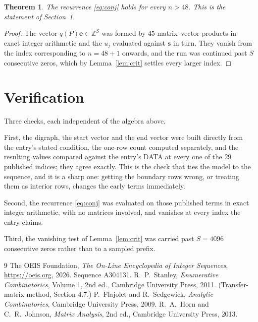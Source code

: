 \documentclass[11pt,a4paper]{article}
\theoremstyle{plain}
\newtheorem{theorem}{Theorem}
\theoremstyle{definition}
\begin{document}
\begin{theorem}
The recurrence \eqref{eq:conj} holds for every $n>48$. This is the statement of
Section~1.
\end{theorem}

\begin{proof}
The vector $q(P)\mathbf{e}\in\mathbb{Z}^{S}$ was formed by $45$ matrix--vector
products in exact integer arithmetic and the $u_j$ evaluated against $\mathbf{s}$ in turn.
They vanish from the index corresponding to $n=48+1$ onwards, and the run was continued
past $S$ consecutive zeros, which by Lemma~\ref{lem:crit} settles every larger index.
\end{proof}

\section{Verification}

Three checks, each independent of the algebra above.

First, the digraph, the start vector and the end vector were built directly from the
entry's stated condition, the one-row count computed separately, and the resulting values
compared against the entry's DATA at every one of the $29$ published indices; they
agree exactly. This is the check that ties the model to the sequence, and it is a sharp one:
getting the boundary rows wrong, or treating them as interior rows, changes the early terms
immediately.

Second, the recurrence \eqref{eq:conj} was evaluated on those published terms in exact
integer arithmetic, with no matrices involved, and vanishes at every index the entry claims.

Third, the vanishing test of Lemma~\ref{lem:crit} was carried past $S=4096$ consecutive
zeros rather than to a sampled prefix.

\begin{thebibliography}{9}
 The OEIS Foundation, \emph{The On-Line Encyclopedia of Integer
Sequences}, \url{https://oeis.org}, 2026. Sequence A304131.
 R.~P.~Stanley, \emph{Enumerative Combinatorics}, Volume 1, 2nd ed.,
Cambridge University Press, 2011. (Transfer-matrix method, Section 4.7.)
 P.~Flajolet and R.~Sedgewick, \emph{Analytic Combinatorics}, Cambridge
University Press, 2009.
 R.~A.~Horn and C.~R.~Johnson, \emph{Matrix Analysis}, 2nd ed., Cambridge
University Press, 2013.
\end{thebibliography}
\end{document}
